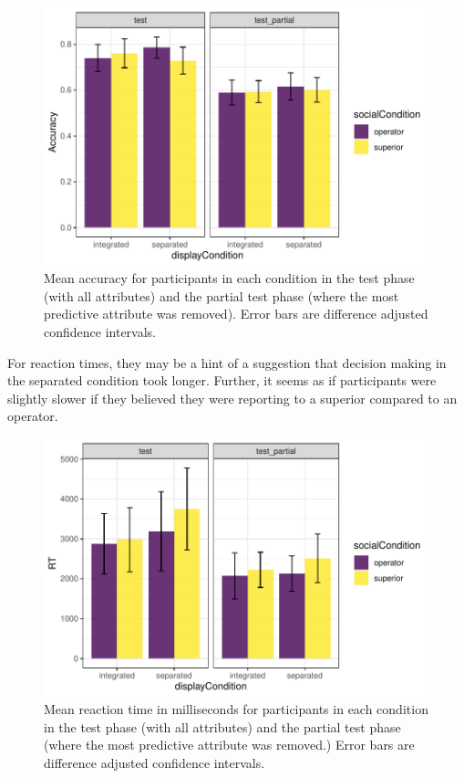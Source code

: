\documentclass[doc, a4paper, apacite]{apa6}
\begin{document}
\begin{figure}
	\centering
	\includegraphics{images/DSTL07testSummaryAccuracy}
	\caption{Mean accuracy for participants in each condition in the test phase (with all attributes) and the partial test phase (where the most predictive attribute was removed). Error bars are difference adjusted confidence intervals.}
	\label{fig:DSTL07testAccuracy}	
\end{figure}

For reaction times, they may be a hint of a suggestion that decision making in the separated condition took longer. 
Further, it seems as if participants were slightly slower if they believed they were reporting to a superior compared to an operator. 

\begin{figure}
	\centering
	\includegraphics{images/DSTL07testSummaryRT.pdf}	
	\caption{Mean reaction time in milliseconds for participants in each condition in the test phase (with all attributes) and the partial test phase (where the most predictive attribute was removed.) Error bars are difference adjusted confidence intervals.}
	\label{fig:DSTL08testRT}
\end{figure}
\end{document}
